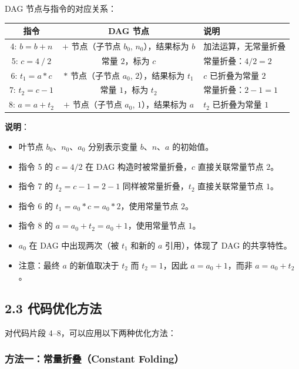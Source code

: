 \documentclass[12pt]{article}
\begin{document}
DAG 节点与指令的对应关系：

\begin{center}
\begin{tabular}{ccl}
\toprule
\textbf{指令} & \textbf{DAG 节点} & \textbf{说明} \\
\midrule
4: $b = b + n$   & $+$ 节点（子节点 $b_0$, $n_0$），结果标为 $b$ & 加法运算，无常量折叠 \\
5: $c = 4\ /\ 2$ & 常量 $2$，标为 $c$   & 常量折叠：$4/2 = 2$ \\
6: $t_1 = a * c$ & $*$ 节点（子节点 $a_0$, $2$），结果标为 $t_1$ & $c$ 已折叠为常量 $2$ \\
7: $t_2 = c - 1$ & 常量 $1$，标为 $t_2$ & 常量折叠：$2 - 1 = 1$ \\
8: $a = a + t_2$ & $+$ 节点（子节点 $a_0$, $1$），结果标为 $a$ & $t_2$ 已折叠为常量 $1$ \\
\bottomrule
\end{tabular}
\end{center}

\textbf{说明}：
\begin{itemize}
    \item 叶节点 $b_0$、$n_0$、$a_0$ 分别表示变量 $b$、$n$、$a$ 的初始值。
    \item 指令 5 的 $c = 4/2$ 在 DAG 构造时被常量折叠，$c$ 直接关联常量节点 $2$。
    \item 指令 7 的 $t_2 = c - 1 = 2 - 1$ 同样被常量折叠，$t_2$ 直接关联常量节点 $1$。
    \item 指令 6 的 $t_1 = a_0 * c = a_0 * 2$，使用常量节点 $2$。
    \item 指令 8 的 $a = a_0 + t_2 = a_0 + 1$，使用常量节点 $1$。
    \item $a_0$ 在 DAG 中出现两次（被 $t_1$ 和新的 $a$ 引用），体现了 DAG 的共享特性。
    \item 注意：最终 $a$ 的新值取决于 $t_2$ 而 $t_2=1$，因此 $a = a_0 + 1$，而非 $a = a_0 + t_2$。
\end{itemize}

\subsection*{2.3 代码优化方法}

对代码片段 4--8，可以应用以下两种优化方法：

\subsubsection*{方法一：常量折叠（Constant Folding）}
\end{document}
